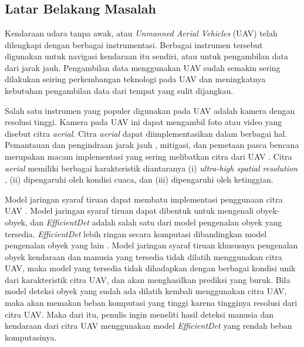 
\chapter{\babSatu}
\section{Latar Belakang Masalah}
Kendaraan udara tanpa awak, atau \textit{Unmanned Aerial Vehicles} (UAV) telah dilengkapi dengan berbagai instrumentasi. Berbagai instrumen tersebut digunakan untuk navigasi kendaraan itu sendiri, atau untuk pengambilan data dari jarak jauh. Pengambilan data menggunakan UAV sudah semakin sering dilakukan seiring perkembangan teknologi pada UAV dan meningkatnya kebutuhan pengambilan data dari tempat yang sulit dijangkau.

\par Salah satu instrumen yang populer digunakan pada UAV adalah kamera dengan resolusi tinggi. Kamera pada UAV ini dapat mengambil foto atau video yang disebut citra \textit{aerial}. Citra \textit{aerial} dapat diimplementasikan dalam berbagai hal. Pemantauan dan pengindraan jarak jauh \cite{ricecounting} \cite{rs4113390}, mitigasi, dan pemetaan pasca bencana merupakan macam implementasi yang sering melibatkan citra dari UAV \cite{uavdesigndeploy} \cite{6237316}.  Citra \textit{aerial} memiliki berbagai karakteristik diantaranya (i) \textit{ultra-high spatial resolution} \cite{app9040643}, (ii) dipengaruhi oleh kondisi cuaca, dan (iii) dipengaruhi oleh ketinggian. 

\par Model jaringan syaraf tiruan dapat membatu implementasi penggunaan citra UAV \cite{kyrkou2018dronet}. Model jaringan syaraf tiruan dapat dibentuk untuk mengenali obyek-obyek, dan \textit{EfficientDet} adalah salah satu dari model pengenalan obyek yang tersedia. \textit{EfficientDet} lebih ringan secara komputasi dibandingkan model pengenalan obyek yang lain \cite{tan2020efficientdet}. Model jaringan syaraf tiruan khususnya pengenalan obyek kendaraan dan manusia yang tersedia tidak dilatih menggunakan citra UAV, maka model yang tersedia tidak dihadapkan dengan berbagai kondisi unik dari karakteristik citra UAV, dan akan menghasilkan prediksi yang buruk. Bila model deteksi obyek yang sudah ada dilatih kembali menggunakan citra UAV, maka akan memakan beban komputasi yang tinggi karena tingginya resolusi dari citra UAV. Maka dari itu, penulis ingin meneliti hasil deteksi manusia dan kendaraan dari citra UAV menggunakan model \textit{EfficientDet} yang rendah beban komputasinya.

